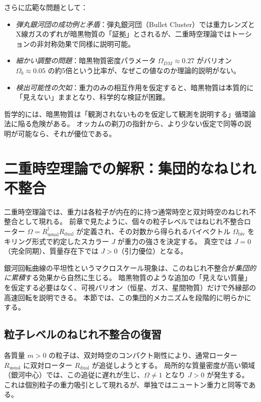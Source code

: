 \documentclass[dvipdfmx,a4paper]{jsbook}
\theoremstyle{definition}
\theoremstyle{remark}
\begin{document}
さらに広範な問題として：
\begin{itemize}
  \item \emph{弾丸銀河団の成功例と矛盾}：弾丸銀河団（Bullet Cluster）では重力レンズとX線ガスのずれが暗黒物質の「証拠」とされるが、二重時空理論ではトーションの非対称効果で同様に説明可能。
  \item \emph{細かい調整の問題}：暗黒物質密度パラメータ $\Omega_{DM} \approx 0.27$ がバリオン $\Omega_b \approx 0.05$ の約5倍という比率が、なぜこの値なのか理論的説明がない。
  \item \emph{検出可能性の欠如}：重力のみの相互作用を仮定すると、暗黒物質は本質的に「見えない」ままとなり、科学的な検証が困難。
\end{itemize}

哲学的には、暗黒物質は「観測されないものを仮定して観測を説明する」循環論法に陥る危険がある。  
オッカムの剃刀の指針から、より少ない仮定で同等の説明が可能なら、それが優位である。

\section{二重時空理論での解釈：集団的なねじれ不整合}
\label{sec:collective-torsion}

二重時空理論では、重力は各粒子が内在的に持つ通常時空と双対時空のねじれ不整合として現れる。  
前章で見たように、個々の粒子レベルではねじれ不整合ローター $\Omega = R_\text{usual}^\dagger R_\text{dual}$ が定義され、その対数から得られるバイベクトル $\Omega_\text{biv}$ をキリング形式で約定したスカラー $J$ が重力の強さを決定する。  
真空では $J=0$（完全同期）、質量存在下では $J>0$（引力優位）となる。

銀河回転曲線の平坦性というマクロスケール現象は、このねじれ不整合が\emph{集団的に累積}する効果から自然に生じる。  
暗黒物質のような追加の「見えない質量」を仮定する必要はなく、可視バリオン（恒星、ガス、星間物質）だけで外縁部の高速回転を説明できる。  
本節では、この集団的メカニズムを段階的に明らかにする。

\subsection{粒子レベルのねじれ不整合の復習}

各質量 $m>0$ の粒子は、双対時空のコンパクト剛性により、通常ローター $R_\text{usual}$ に双対ローター $R_\text{dual}$ が追従しようとする。  
局所的な質量密度が高い領域（銀河中心）では、この追従に遅れが生じ、$\Omega \neq 1$ となり $J>0$ が発生する。  
これは個別粒子の重力吸引として現れるが、単独ではニュートン重力と同等である。
\end{document}
